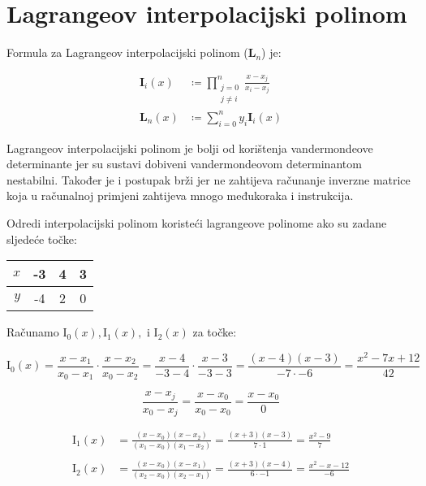 \section{Lagrangeov interpolacijski polinom}

Formula za Lagrangeov interpolacijski polinom (${\mathbf L}_n$) je:

\begin{align}
    {\mathbf I}_i(x) &\coloneq \prod_{\substack{j=0\\j\neq i}}^{n} \frac{x-x_j}{x_i-x_j}\\
    {\mathbf L}_n(x) &\coloneq \sum_{i=0}^{n} y_i\mathbf{I}_i(x)
\end{align}

Lagrangeov interpolacijski polinom je bolji od korištenja vandermondeove determinante jer su sustavi dobiveni vandermondeovom determinantom nestabilni.
Također je i postupak brži jer ne zahtijeva računanje inverzne matrice koja u računalnoj primjeni zahtijeva mnogo međukoraka i instrukcija.

\begin{examplebox}
    Odredi interpolacijski polinom koristeći lagrangeove polinome ako su zadane sljedeće točke:

    \center
    \begin{tabular}{r|c|c|c}
        $x$&-3&4&3\\
        \hline
        $y$&-4&2&0\\
    \end{tabular}
\end{examplebox}

Računamo $\mathrm{I}_0(x), \mathrm{I}_1(x),$ i $\mathrm{I}_2(x)$ za točke:

$$
\mathrm{I}_0(x) = \frac{x-x_1}{x_0-x_1} \cdot \frac{x-x_2}{x_0-x_2} = \frac{x-4}{-3-4} \cdot \frac{x-3}{-3-3} = \frac{(x-4)(x-3)}{-7\cdot-6} = \frac{x^2-7x+12}{42}
$$

\begin{warningbox}
    $$
    \frac{x-x_j}{x_0-x_j}=\frac{x-x_0}{x_0-x_0}=\frac{x-x_0}{0}
    $$
\end{warningbox}

\begin{align*}
\mathrm{I}_1(x) &= \frac{(x-x_0)(x-x_2)}{(x_1-x_0)(x_1-x_2)} = \frac{(x+3)(x-3)}{7\cdot1} = \frac{x^2-9}{7}\\\\
\mathrm{I}_2(x) &= \frac{(x-x_0)(x-x_1)}{(x_2-x_0)(x_2-x_1)} = \frac{(x+3)(x-4)}{6\cdot-1} = \frac{x^2-x-12}{-6}
\end{align*}

